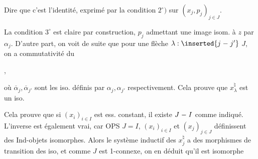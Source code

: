 
Dire que c'est l'identité,   exprimé par la condition $2^\circ)$ sur $(x_j,p_j)_{j\in J}$.

La condition $3^\circ$ est claire par construction, $p_j$ admettant une image isom. à $z$ par $\alpha_j$. D'autre part, on voit de suite que pour une flèche $\lambda:\inserted{j\mathrel{\relbar}j'}$  $J$, on a commutativité du

,

où $\overline\alpha_j,\overline\alpha_{j'}$ sont les iso. définis par $\alpha_j,\alpha_{j'}$ respectivement. Cela prouve que $x_\lambda^\natural$ est un iso.

Cela prouve que si $(x_i)_{i\in I}$ est ess. constant, il existe $J\mathrel{\relbar} I$ comme indiqué. L'inverse est également vrai, car OPS $J=I$,  $(x_i)_{i\in I}$ et $(x_j)_{j\in J}$ définissent des Ind-objets isomorphes. Alors le système inductif des $x_j^\natural$ a des morphismes de transition des iso, et comme $J$ est  1-connexe, on en déduit  qu'il est isomorphe
